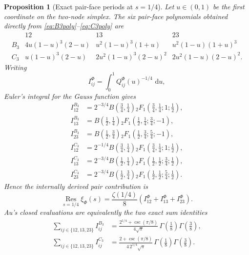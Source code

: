 \documentclass[11pt]{article}
\newtheorem{proposition}[theorem]{Proposition}
\newcommand{\Res}{\operatorname*{Res}}
\newcommand{\dd}{\,\mathrm d}
\begin{document}
\begin{proposition}[Exact pair-face periods at \(s=1/4\)]
\label{prop:B3C3-pair-periods}
Let \(u\in(0,1)\) be the first coordinate on the two-node simplex.
The six pair-face polynomials obtained directly from
\eqref{eq:B3poly}--\eqref{eq:C3poly} are
\[
\begin{array}{c|ccc}
 &12&13&23\\
\hline
B_3&
4u(1-u)^3(2-u)&
u^2(1-u)^3(1+u)&
u^2(1-u)(1+u)^3\\[1mm]
C_3&
u(1-u)^3(2-u)&
2u^2(1-u)^3(2-u)^2&
2u^2(1-u)(2-u)^2.
\end{array}
\]
Writing
\[
 I^\Phi_{ij}=\int_0^1Q^\Phi_{ij}(u)^{-1/4}\,\dd u,
\]
Euler's integral for the Gauss function gives
\begin{align}
 I^{B_3}_{12}
 &=2^{-3/4}B\!\left(\frac34,\frac14\right)
 {}_2F_1\!\left(\frac34,\frac14;1;\frac12\right),\label{eq:B3I12}\\
 I^{B_3}_{13}
 &=B\!\left(\frac12,\frac14\right)
 {}_2F_1\!\left(\frac12,\frac14;\frac34;-1\right),\label{eq:B3I13}\\
 I^{B_3}_{23}
 &=B\!\left(\frac12,\frac34\right)
 {}_2F_1\!\left(\frac12,\frac34;\frac54;-1\right),\label{eq:B3I23}\\
 I^{C_3}_{12}
 &=2^{-1/4}B\!\left(\frac34,\frac14\right)
 {}_2F_1\!\left(\frac34,\frac14;1;\frac12\right),\label{eq:C3I12}\\
 I^{C_3}_{13}
 &=2^{-3/4}B\!\left(\frac12,\frac14\right)
 {}_2F_1\!\left(\frac12,\frac12;\frac34;\frac12\right),\label{eq:C3I13}\\
 I^{C_3}_{23}
 &=2^{-3/4}B\!\left(\frac12,\frac34\right)
 {}_2F_1\!\left(\frac12,\frac12;\frac54;\frac12\right).\label{eq:C3I23}
\end{align}
Hence the internally derived pair contribution is
\[
 \Res_{s=1/4}\xi_\Phi(s)
 =\frac{\zeta(1/4)}8
 \left(I^\Phi_{12}+I^\Phi_{13}+I^\Phi_{23}\right).
\]
Au's closed evaluations are equivalently the two exact sum identities
\begin{align}
 \sum_{ij\in\{12,13,23\}}I^{B_3}_{ij}
 &=
 \frac{2^{1/4}+\csc(\pi/8)}{4\sqrt\pi}\,
 \Gamma\!\left(\frac18\right)\Gamma\!\left(\frac38\right),
 \label{eq:B3-period-sum}\\
 \sum_{ij\in\{12,13,23\}}I^{C_3}_{ij}
 &=
 \frac{2+\csc(\pi/8)}{4\,2^{1/4}\sqrt\pi}\,
 \Gamma\!\left(\frac18\right)\Gamma\!\left(\frac38\right).
 \label{eq:C3-period-sum}
\end{align}
\end{proposition}
\end{document}
